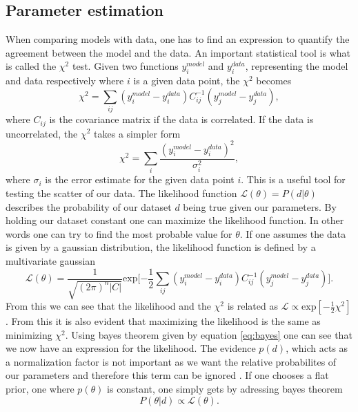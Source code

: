 \subsection{Parameter estimation}
When comparing models with data, one has to find an expression to quantify the
agreement between the model and the data. An important statistical tool is what
is called the $\chi^2$ test. Given two functions $y^{model}_i$ and $y^{data}_i$,
representing the model and data respectively where $i$ is a given data point,
the $\chi^2$ becomes
\begin{equation}
    \chi^2=\sum_{ij}(y^{model}_i-y^{data}_i)C_{ij}^{-1}(y^{model}_j-y^{data}_j),
\end{equation}
where $C_{ij}$ is the covariance matrix if the data is correlated. If the data
is uncorrelated, the $\chi^2$ takes a simpler form
\begin{equation}
    \chi^2=\sum_{i}\frac{(y^{model}_i-y^{data}_i)^2}{\sigma_i^2},
\end{equation}
where $\sigma_i$ is the error estimate for the given data point $i$. This is a
useful tool for testing the scatter of our data. The likelihood function
$\mathcal{L}(\theta)=P(d\vert \theta)$ describes the probability of our dataset
$d$ being true given our parameters. By holding our dataset constant one can
maximize the likelihood function. In other words one can try to find the most
probable value for $\theta$. If one assumes the data is given by a gaussian
distribution, the likelihood function is defined by a multivariate gaussian
\begin{equation}
    \mathcal{L}(\theta) = \frac{1}{\sqrt{(2\pi)^n\vert C \vert}}\mathrm{exp}\big[{-\frac{1}{2}}\sum_{ij}(y^{model}_i-y^{data}_i)C_{ij}^{-1}(y^{model}_j-y^{data}_j)\big].
\end{equation}
From this we can see that the likelihood and the $\chi^2$ is related as
$\mathcal{L}\propto \mathrm{exp}[-\frac{1}{2}\chi^2]$. From this it is also evident that
maximizing the likelihood is the same as minimizing $\chi^2$. Using bayes theorem given by equation
\ref{eq:bayes} one can see that we now have an expression for the likelihood.
The evidence $p(d)$, which acts as a normalization factor is not important as we
want the relative probabilites of our parameters and therefore this term can be
ignored \cite{heavens2010statistical}. If one chooses a flat prior, one where
$p(\theta)$ is constant, one simply gets by adressing bayes theorem
\begin{equation}
    P(\theta\vert d) \propto \mathcal{L}(\theta).
\end{equation}
